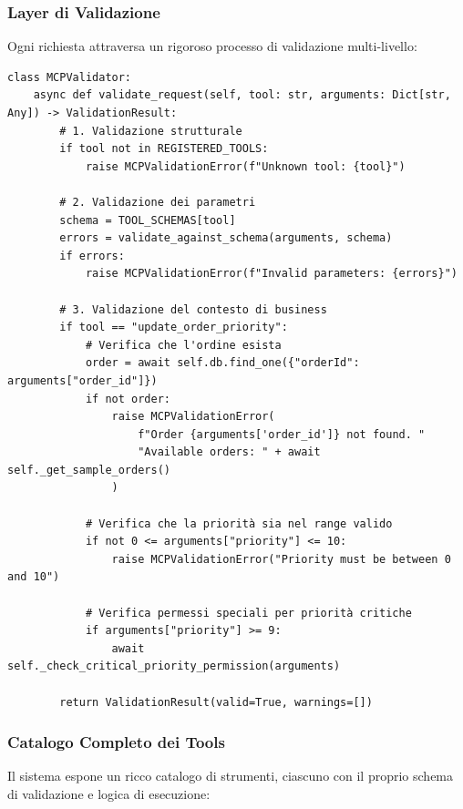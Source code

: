 \subsubsection{Layer di Validazione}
Ogni richiesta attraversa un rigoroso processo di validazione multi-livello:

\begin{listing}[H]
\begin{verbatim}
class MCPValidator:
    async def validate_request(self, tool: str, arguments: Dict[str, Any]) -> ValidationResult:
        # 1. Validazione strutturale
        if tool not in REGISTERED_TOOLS:
            raise MCPValidationError(f"Unknown tool: {tool}")
        
        # 2. Validazione dei parametri
        schema = TOOL_SCHEMAS[tool]
        errors = validate_against_schema(arguments, schema)
        if errors:
            raise MCPValidationError(f"Invalid parameters: {errors}")
        
        # 3. Validazione del contesto di business
        if tool == "update_order_priority":
            # Verifica che l'ordine esista
            order = await self.db.find_one({"orderId": arguments["order_id"]})
            if not order:
                raise MCPValidationError(
                    f"Order {arguments['order_id']} not found. "
                    "Available orders: " + await self._get_sample_orders()
                )
            
            # Verifica che la priorità sia nel range valido
            if not 0 <= arguments["priority"] <= 10:
                raise MCPValidationError("Priority must be between 0 and 10")
            
            # Verifica permessi speciali per priorità critiche
            if arguments["priority"] >= 9:
                await self._check_critical_priority_permission(arguments)
        
        return ValidationResult(valid=True, warnings=[])
\end{verbatim}
\caption{Sistema di validazione MCP}
\label{listing:mcp-validation}
\end{listing}

\subsubsection{Catalogo Completo dei Tools}
Il sistema espone un ricco catalogo di strumenti, ciascuno con il proprio schema di validazione e logica di esecuzione:

